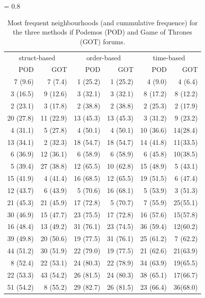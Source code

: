 \documentclass[conference]{IEEEtran}
\begin{document}
\begin{table}
 \begin{center}
   \tabcolsep = 0.8\tabcolsep
   \begin{tabular}{|rr|rr|rr|}
      \hline
      \multicolumn{2}{|c|}{struct-based} & \multicolumn{2}{|c|}{order-based} &  \multicolumn{2}{|c|}{time-based} \\
     	 POD & GOT 						& POD & GOT 		& POD & GOT\\
   \hline \hline
     7 (9.6)	& 7 (7.4)   		&  		1 (25.2) & 1 (25.2) &  4 (9.0) & 4 (6.4)\\    
     3 (16.5)& 9 (12.6)   	&  	3 (32.1) & 3 (32.1) &  8 (17.2) & 8 (12.2)\\ 
     2 (23.1)& 3 (17.8)   	&  	2 (38.8) & 2 (38.8) &  2 (25.3) & 2 (17.9)\\ 
     20 (27.8)& 11 (22.9)   &  	13 (45.3) & 13 (45.3) &  3 (31.2) & 9 (23.2)\\    
     4 (31.1)& 5 (27.8)   	&  	4 (50.1) & 4 (50.1) &  10 (36.6) & 14(28.4)\\ 
     13 (34.1)& 2 (32.3)   	&  	18 (54.7) & 18 (54.7) &  14 (41.8) & 11(33.5)\\ 
     6 (36.9)& 12 (36.1)   	&  	6 (58.9) & 6 (58.9) &  6 (45.8) & 10(38.5)\\    
     5 (39.4)& 27 (38.8)   	&	  	12 (65.5) & 10 (62.8) &  15 (48.9) & 5 (43.1)\\ 
     15 (41.9)& 4 (41.4)   	&  	16 (68.5) & 12 (65.5) &  19 (51.5) & 6 (47.4)\\  
     12 (43.7)& 6 (43.9)   	&  	5 (70.6) & 16 (68.1) &  5 (53.9) & 3 (51.3)\\    
     21 (45.3)& 21 (45.9)   	&  	17 (72.8) & 5 (70.7) &  7 (55.9) & 25(55.1)\\ 
     30 (46.9)& 15 (47.7)   	&  	23 (75.5) & 17 (72.8)&  16 (57.6) & 15(57.8)\\ 
     16 (48.4)& 13 (49.2)   	&  	31 (76.1) & 23 (74.5)&  36 (59.4) & 12(60.2)\\    
     39 (49.8)& 20 (50.6)   	&  	19 (77.5) & 31 (76.1) &  25 (61.2) & 7 (62.2)\\ 
     44 (51.2)& 30 (51.9)   	&  	22 (79.0) & 19 (77.5) &  21 (62.6) & 21(63.9)\\ 
     8 (52.4)& 22 (53.1)   	&	  	24 (80.3) & 22 (78.9) &  34 (63.9) & 19(65.5)\\    
     22 (53.3)& 43 (54.2)   	&  	26 (81.5) & 24 (80.3) &  38 (65.1) & 17(66.7)\\ 
     51 (54.2)& 8 (55.2)   	&  	29 (82.7)& 26 (81.5) &  23 (66.4) & 36(68.0)\\          
   \hline
   \end{tabular}
\label{tab:table}
 \end{center}
 \caption{Most frequent neighbourhoods (and cummulative frequence) for the three methods if Podemos (POD) and Game of Thrones (GOT) forums.}
\end{table}
\end{document}
